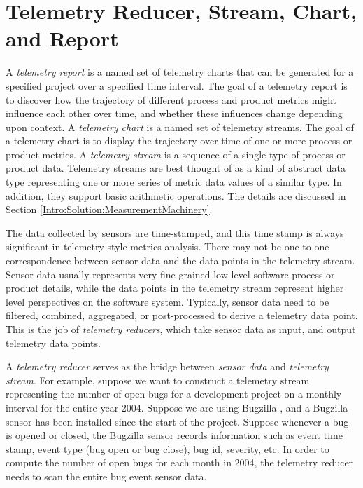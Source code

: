 
\section{Telemetry Reducer, Stream, Chart, and Report} 
\label{Telemetry:Component}

A \textit{telemetry report} is a named set of telemetry charts that can be generated for a specified project over a specified time interval. The goal of a telemetry report is to discover how the trajectory of different process and product metrics might influence each other over time, and whether these influences change depending upon context.
A \textit{telemetry chart }is a named set of telemetry streams. The goal of a telemetry chart is to display the trajectory over time of one or more process or product metrics.
A \textit{telemetry stream} is a sequence of a single type of process or product data. Telemetry streams are best thought of as a kind of abstract data type representing one or more series of metric data values of a similar type. In addition, they support basic arithmetic operations. The details are discussed in Section \ref{Intro:Solution:MeasurementMachinery}. 
 
The data collected by sensors are time-stamped, and this time stamp is always significant in telemetry style metrics analysis. There may not be one-to-one correspondence between sensor data and the data points in the telemetry stream. Sensor data usually represents very fine-grained low level software process or product details, while the data points in the telemetry stream represent higher level perspectives on the software system. Typically, sensor data need to be filtered, combined, aggregated, or post-processed to derive a telemetry data point. This is the job of \textit{telemetry reducers}, which take sensor data as input, and output telemetry data points.

A \textit{telemetry reducer} serves as the bridge between \textit{sensor data} and \textit{telemetry stream}. For example, suppose we want to construct a telemetry stream representing the number of open bugs for a development project on a monthly interval for the entire year 2004. Suppose we are using Bugzilla \cite{Software:Bugzilla}, and a Bugzilla sensor has been installed since the start of the project. Suppose whenever a bug is opened or closed, the Bugzilla sensor records information such as event time stamp, event type (bug open or bug close), bug id, severity, etc. In order to compute the number of open bugs for each month in 2004, the telemetry reducer needs to scan the entire bug event sensor data.    

